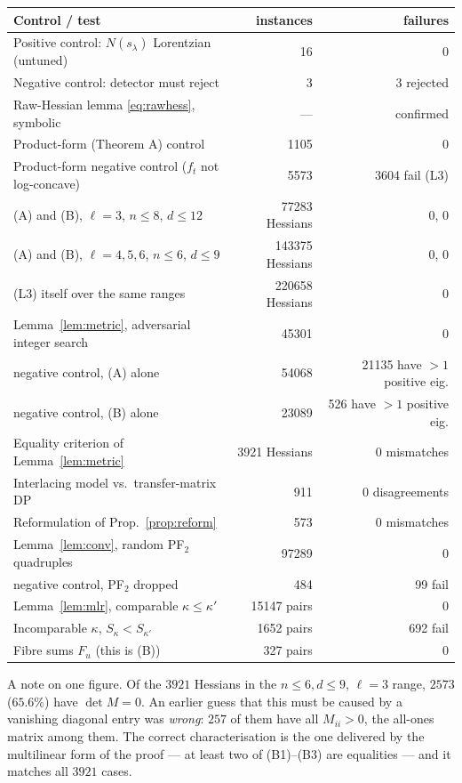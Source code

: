 \documentclass[11pt]{article}
\theoremstyle{plain}
\theoremstyle{definition}
\begin{document}
\begin{center}
\begin{tabular}{lrr}
\hline
Control / test & instances & failures\\
\hline
Positive control: $N(s_\lambda)$ Lorentzian (untuned) & 16 & 0\\
Negative control: detector must reject & 3 & 3 rejected\\
Raw-Hessian lemma \eqref{eq:rawhess}, symbolic & --- & confirmed\\
Product-form (Theorem A) control & 1105 & 0\\
Product-form negative control ($f_t$ not log-concave) & 5573 & 3604 fail (L3)\\
\hline
(A) and (B), $\ell=3$, $n\le8$, $d\le12$ & 77283 Hessians & 0, 0\\
(A) and (B), $\ell=4,5,6$, $n\le6$, $d\le9$ & 143375 Hessians & 0, 0\\
(L3) itself over the same ranges & 220658 Hessians & 0\\
\hline
Lemma~\ref{lem:metric}, adversarial integer search & 45301 & 0\\
\quad negative control, (A) alone & 54068 & 21135 have $>1$ positive eig.\\
\quad negative control, (B) alone & 23089 & 526 have $>1$ positive eig.\\
Equality criterion of Lemma~\ref{lem:metric} & 3921 Hessians & 0 mismatches\\
\hline
Interlacing model vs.\ transfer-matrix DP & 911 & 0 disagreements\\
Reformulation of Prop.~\ref{prop:reform} & 573 & 0 mismatches\\
Lemma~\ref{lem:conv}, random PF$_2$ quadruples & 97289 & 0\\
\quad negative control, PF$_2$ dropped & 484 & 99 fail\\
Lemma~\ref{lem:mlr}, comparable $\kappa\le\kappa'$ & 15147 pairs & 0\\
Incomparable $\kappa$, $S_\kappa<S_{\kappa'}$ & 1652 pairs & 692 fail\\
Fibre sums $F_u$ (this is (B)) & 327 pairs & 0\\
\hline
\end{tabular}
\end{center}

A note on one figure. Of the $3921$ Hessians in the $n\le6,d\le9$, $\ell=3$ range, $2573$
($65.6\%$) have $\det M=0$. An earlier guess that this must be caused by a vanishing diagonal entry
was \emph{wrong}: $257$ of them have all $M_{ii}>0$, the all-ones matrix among them. The correct
characterisation is the one delivered by the multilinear form of the proof --- at least two of
(B1)--(B3) are equalities --- and it matches all $3921$ cases.
\end{document}
